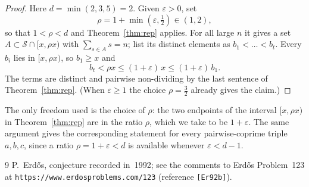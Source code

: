\documentclass[11pt,reqno]{amsart}
\newcommand{\Sg}{\mathcal S}
\begin{document}
\begin{proof}
Here $d=\min(2,3,5)=2$.  Given $\varepsilon>0$, set
\[
  \rho=1+\min\!\left(\varepsilon,\tfrac12\right)\in(1,2),
\]
so that $1<\rho<d$ and Theorem~\ref{thm:rep} applies.  For all large $n$ it gives a set
$A\subset\Sg\cap[x,\rho x)$ with $\sum_{s\in A}s=n$; list its distinct elements as
$b_{1}<\dots<b_{t}$.  Every $b_{i}$ lies in $[x,\rho x)$, so $b_{1}\ge x$ and
\[
  b_{t}<\rho x\le(1+\varepsilon)\,x\le(1+\varepsilon)\,b_{1}.
\]
The terms are distinct and pairwise non-dividing by the last sentence of
Theorem~\ref{thm:rep}.  (When $\varepsilon\ge1$ the choice $\rho=\tfrac32$ already gives
the claim.)
\end{proof}

The only freedom used is the choice of $\rho$: the two endpoints of the interval
$[x,\rho x)$ in Theorem~\ref{thm:rep} are in the ratio $\rho$, which we take to be
$1+\varepsilon$.  The same argument gives the corresponding statement for every
pairwise-coprime triple $a,b,c$, since a ratio $\rho=1+\varepsilon<d$ is available whenever
$\varepsilon<d-1$.

\begin{thebibliography}{9}
P.~Erd\H{o}s, conjecture recorded in~1992; see the comments to Erd\H{o}s Problem~123 at
\texttt{https://www.erdosproblems.com/123} (reference \texttt{[Er92b]}).
\end{thebibliography}
\end{document}
